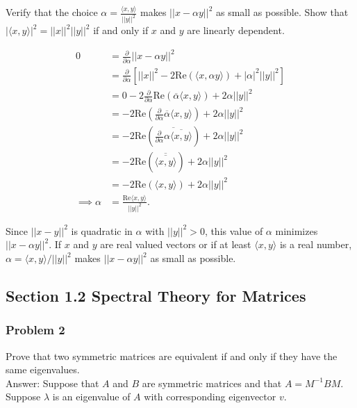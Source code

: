 \documentclass{article}
\newcommand{\RE}{\mathrm{Re}}
\begin{document}
Verify that the choice $\alpha = \frac{\langle x , y \rangle}{||y||^2}$ makes $||x - \alpha y||^2$ as small as possible. Show that $|\langle x , y \rangle |^2 = ||x||^2 ||y||^2$ if and only if $x$ and $y$ are linearly dependent. 

\begin{align*}
0 &= \frac{\partial}{\partial \alpha} ||x - \alpha y||^2 \\
&= \frac{\partial}{\partial \alpha} \left[ ||x||^2 - 2\RE\left( \langle x , \alpha y \rangle \right) + |\alpha|^2 ||y||^2 \right] \\
&= 0 - 2\frac{\partial}{\partial \alpha} \RE \left(\overline{\alpha} \langle x , y \rangle \right) + 2\alpha ||y||^2 \\
&= - 2 \RE \left( \frac{\partial}{\partial \alpha} \overline{\alpha}\langle x , y \rangle \right) + 2\alpha ||y||^2 \\
&= - 2 \RE \left( \overline{\frac{\partial}{\partial \alpha} \alpha \overline{\langle x , y \rangle} }\right) + 2\alpha ||y||^2 \\
&= - 2 \RE \left(\overline{\overline{\langle x , y \rangle}} \right) + 2\alpha ||y||^2 \\
&= - 2 \RE \left(\langle x , y \rangle \right) + 2\alpha ||y||^2 \\
\implies \alpha &= \frac{\RE \langle x , y \rangle}{||y||^2}.
\end{align*}

Since $||x - y||^2$ is quadratic in $\alpha$ with $||y||^2 > 0$, this value of $\alpha$ minimizes $||x - \alpha y ||^2$. If $x$ and $y$ are real valued vectors or if at least $\langle x , y \rangle$ is a real number, $\alpha = \langle x , y \rangle / ||y||^2$ makes $||x - \alpha y||^2$ as small as possible. 

\newpage
\subsection*{Section 1.2 Spectral Theory for Matrices}

\subsubsection*{Problem 2}

Prove that two symmetric matrices are equivalent if and only if they have the same eigenvalues. \\

Answer: Suppose that $A$ and $B$ are symmetric matrices and that $A = M^{-1}BM$. Suppose $\lambda$ is an eigenvalue of $A$ with corresponding eigenvector $v$.
\end{document}
